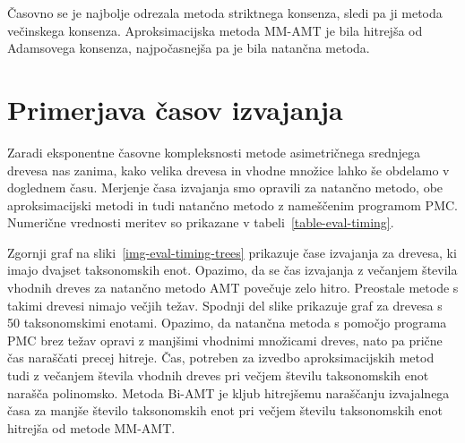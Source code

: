\documentclass[a4paper, 12pt]{book}
\begin{document}
Časovno se je najbolje odrezala metoda striktnega konsenza, sledi pa ji metoda večinskega
konsenza. Aproksimacijska metoda MM-AMT je bila hitrejša od Adamsovega konsenza,
najpočasnejša pa je bila natančna metoda.

\section{Primerjava časov izvajanja}
Zaradi eksponentne časovne kompleksnosti metode asimetričnega srednjega drevesa nas 
zanima, kako velika drevesa in vhodne množice lahko še obdelamo v doglednem času.
Merjenje časa izvajanja smo opravili za natančno metodo, obe aproksimacijski metodi
in tudi natančno metodo z nameščenim programom PMC.   
Numerične vrednosti meritev so prikazane v tabeli~\ref{table-eval-timing}.

Zgornji graf na sliki~\ref{img-eval-timing-trees} prikazuje čase izvajanja za
drevesa, ki imajo dvajset taksonomskih enot. Opazimo, da se čas izvajanja z 
večanjem števila vhodnih dreves za natančno metodo AMT povečuje zelo hitro. Preostale
metode s takimi drevesi nimajo večjih težav. Spodnji del slike prikazuje graf za
drevesa s 50 taksonomskimi enotami. Opazimo, da natančna metoda s pomočjo programa
PMC brez težav opravi z manjšimi vhodnimi množicami dreves,
nato pa prične čas naraščati precej hitreje. Čas, potreben za izvedbo aproksimacijskih 
metod tudi z večanjem števila vhodnih dreves pri večjem številu 
taksonomskih enot narašča polinomsko. Metoda Bi-AMT je kljub hitrejšemu naraščanju
izvajalnega časa za manjše število taksonomskih enot pri večjem številu taksonomskih 
enot hitrejša od metode MM-AMT. 
\end{document}
